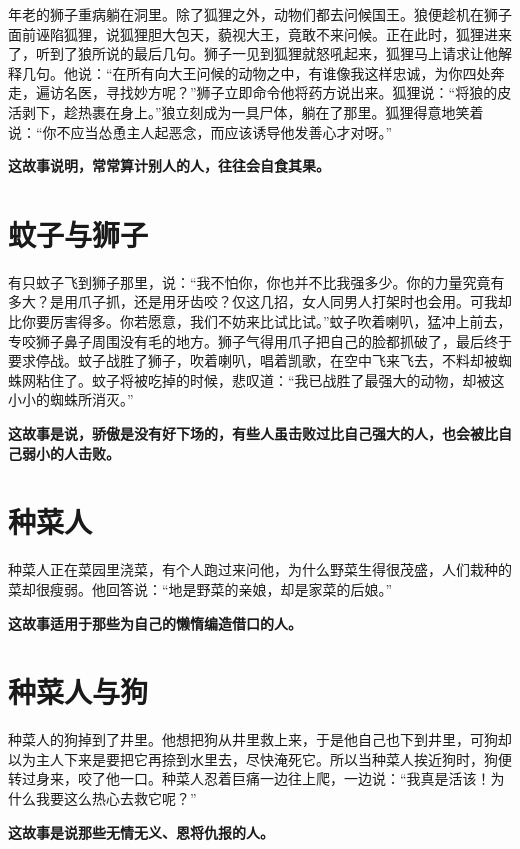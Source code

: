 年老的狮子重病躺在洞里。除了狐狸之外，动物们都去问候国王。狼便趁机在狮子面前诬陷狐狸，说狐狸胆大包天，藐视大王，竟敢不来问候。正在此时，狐狸进来了，听到了狼所说的最后几句。狮子一见到狐狸就怒吼起来，狐狸马上请求让他解释几句。他说：“在所有向大王问候的动物之中，有谁像我这样忠诚，为你四处奔走，遍访名医，寻找妙方呢？”狮子立即命令他将药方说出来。狐狸说：“将狼的皮活剥下，趁热裹在身上。”狼立刻成为一具尸体，躺在了那里。狐狸得意地笑着说：“你不应当怂恿主人起恶念，而应该诱导他发善心才对呀。”

{\bfseries \color{red}这故事说明，常常算计别人的人，往往会自食其果。}

\section{蚊子与狮子}

有只蚊子飞到狮子那里，说：“我不怕你，你也并不比我强多少。你的力量究竟有多大？是用爪子抓，还是用牙齿咬？仅这几招，女人同男人打架时也会用。可我却比你要厉害得多。你若愿意，我们不妨来比试比试。”蚊子吹着喇叭，猛冲上前去，专咬狮子鼻子周围没有毛的地方。狮子气得用爪子把自己的脸都抓破了，最后终于要求停战。蚊子战胜了狮子，吹着喇叭，唱着凯歌，在空中飞来飞去，不料却被蜘蛛网粘住了。蚊子将被吃掉的时候，悲叹道：“我已战胜了最强大的动物，却被这小小的蜘蛛所消灭。”

{\bfseries \color{red}这故事是说，骄傲是没有好下场的，有些人虽击败过比自己强大的人，也会被比自己弱小的人击败。}

\section{种菜人}

种菜人正在菜园里浇菜，有个人跑过来问他，为什么野菜生得很茂盛，人们栽种的菜却很瘦弱。他回答说：“地是野菜的亲娘，却是家菜的后娘。”

{\bfseries \color{red}这故事适用于那些为自己的懒惰编造借口的人。}

\section{种菜人与狗}

种菜人的狗掉到了井里。他想把狗从井里救上来，于是他自己也下到井里，可狗却以为主人下来是要把它再捺到水里去，尽快淹死它。所以当种菜人挨近狗时，狗便转过身来，咬了他一口。种菜人忍着巨痛一边往上爬，一边说：“我真是活该！为什么我要这么热心去救它呢？”

{\bfseries \color{red}这故事是说那些无情无义、恩将仇报的人。}

